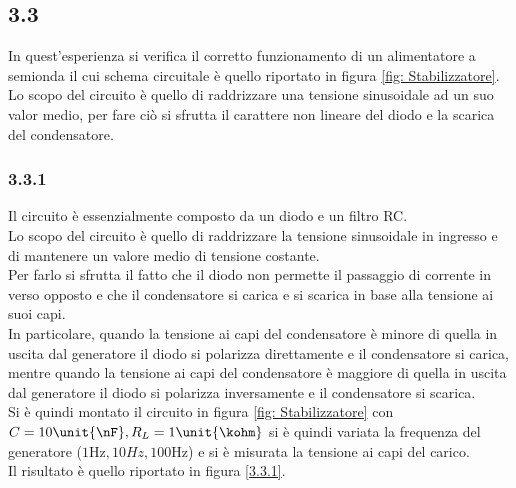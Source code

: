 \subsection{3.3}
In quest'esperienza si verifica il corretto funzionamento di un alimentatore a semionda il cui schema circuitale è quello riportato in figura \ref{fig: Stabilizzatore}. Lo scopo del circuito è quello di raddrizzare una tensione sinusoidale ad un suo valor medio, per fare ciò si sfrutta il carattere non lineare del diodo e la scarica del condensatore.
\subsubsection{3.3.1}
Il circuito è essenzialmente composto da un diodo e un filtro RC.\\
Lo scopo del circuito è quello di raddrizzare la tensione sinusoidale in ingresso e di mantenere un valore medio di tensione costante.\\
Per farlo si sfrutta il fatto che il diodo non permette il passaggio di corrente in verso opposto e che il condensatore si carica e si scarica in base alla tensione ai suoi capi.\\
In particolare, quando la tensione ai capi del condensatore è minore di quella in uscita dal generatore il diodo si polarizza direttamente e il condensatore si carica,
mentre quando la tensione ai capi del condensatore è maggiore di quella in uscita dal generatore il diodo si polarizza inversamente e il condensatore si scarica.\\
Si è quindi montato il circuito in figura \ref{fig: Stabilizzatore} con $C=10\unit{\nF},R_L=1\unit{\kohm}$ si è quindi variata la frequenza del generatore ($1\unit{\Hz},10\unit{Hz},100\unit{\Hz}$) e si è misurata la tensione ai capi del carico.\\
Il risultato è quello riportato in figura \ref{3.3.1}.

